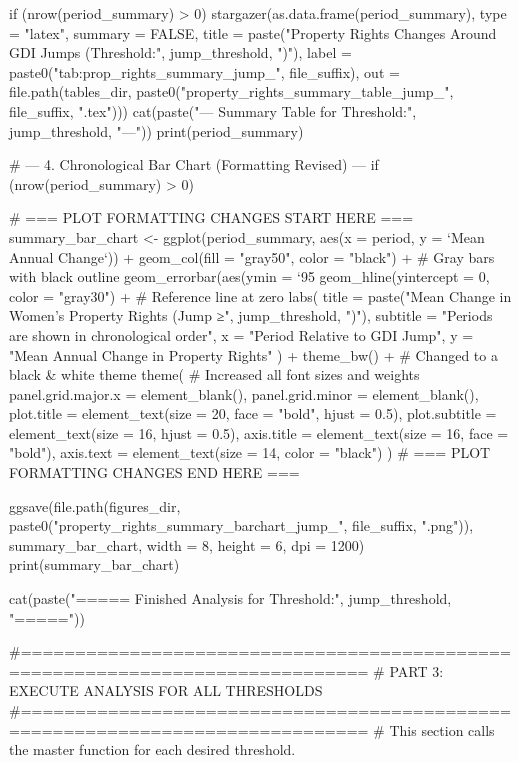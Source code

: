 {{{  if (nrow(period_summary) > 0) {
    stargazer(as.data.frame(period_summary), type = "latex", summary = FALSE,
              title = paste("Property Rights Changes Around GDI Jumps (Threshold:", jump_threshold, ")"),
              label = paste0("tab:prop_rights_summary_jump_", file_suffix),
              out = file.path(tables_dir, paste0("property_rights_summary_table_jump_", file_suffix, ".tex")))
    cat(paste("\n--- Summary Table for Threshold:", jump_threshold, "---\n"))
    print(period_summary)
  }

  # --- 4. Chronological Bar Chart (Formatting Revised) ---
  if (nrow(period_summary) > 0) {
    
    # === PLOT FORMATTING CHANGES START HERE ===
    summary_bar_chart <- ggplot(period_summary, aes(x = period, y = `Mean Annual Change`)) +
      geom_col(fill = "gray50", color = "black") + # Gray bars with black outline
      geom_errorbar(aes(ymin = `95%
      geom_hline(yintercept = 0, color = "gray30") + # Reference line at zero
      labs(
        title = paste("Mean Change in Women's Property Rights (Jump ≥", jump_threshold, ")"),
        subtitle = "Periods are shown in chronological order",
        x = "Period Relative to GDI Jump",
        y = "Mean Annual Change in Property Rights"
      ) +
      theme_bw() + # Changed to a black & white theme
      theme(     # Increased all font sizes and weights
        panel.grid.major.x = element_blank(),
        panel.grid.minor = element_blank(),
        plot.title = element_text(size = 20, face = "bold", hjust = 0.5),
        plot.subtitle = element_text(size = 16, hjust = 0.5),
        axis.title = element_text(size = 16, face = "bold"),
        axis.text = element_text(size = 14, color = "black")
      )
    # === PLOT FORMATTING CHANGES END HERE ===

    ggsave(file.path(figures_dir, paste0("property_rights_summary_barchart_jump_", file_suffix, ".png")), summary_bar_chart, width = 8, height = 6, dpi = 1200)
    print(summary_bar_chart)
  }
  cat(paste("\n===== Finished Analysis for Threshold:", jump_threshold, "=====\n"))
}


#==============================================================================
# PART 3: EXECUTE ANALYSIS FOR ALL THRESHOLDS
#==============================================================================
# This section calls the master function for each desired threshold.

}}
